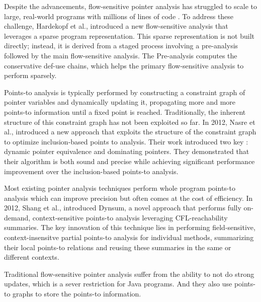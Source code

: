 Despite the advancements, flow-sensitive pointer analysis has struggled to scale to large, real-world programs with millions of lines of code \cite{hardekopf2011flow}.
To address these challenge, Hardekopf et al., \cite{hardekopf2011flow} introduced a new flow-sensitive analysis that leverages a sparse program representation.
This sparse representation is not built directly; instead, it is derived from a staged process involving a pre-analysis followed by the main flow-sensitive analysis.
The Pre-analysis computes the conservative def-use chains, which helps the primary flow-sensitive analysis to perform sparsely.


Points-to analysis is typically performed by constructing a constraint graph of pointer variables and dynamically updating it, propagating more and more points-to information until a fixed point is reached. \cite{nasre2012exploiting}
Traditionally, the inherent structure of this constraint graph has not been exploited so far. 
In 2012, Nasre et al., \cite{nasre2012exploiting} introduced a new approach that exploits the structure of the constraint graph to optimize inclusion-based points to analysis.
Their work introduced two key : dynamic pointer equivalence and dominating pointers.
They demonstrated that their algorithm is both sound and precise while achieving significant performance improvement over the inclusion-based points-to analysis.

Most existing pointer analysis techniques perform whole program points-to analysis which can improve precision but often comes at the cost of efficiency.
In 2012, Shang et al., \cite{shang2012demand} introduced Dynsum, a novel approach that performs fully on-demand, context-sensitive points-to analysis leveraging CFL-reachability summaries.
The key innovation of this technique lies in performing field-sensitive, context-insensitve partial points-to analysis for individual methods, summarizing their local points-to relations and reusing these summaries in the same or different contexts.

Traditional flow-sensitive pointer analysis suffer from the ability to not do strong updates, which is a sever restriction for Java programs.
And they also use points-to graphs to store the points-to information.